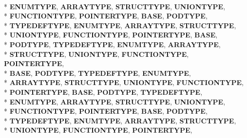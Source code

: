 \begin{DoxyCompactItemize}
\\*
{\bfseries E\-N\-U\-M\-T\-Y\-P\-E}, 
{\bfseries A\-R\-R\-A\-Y\-T\-Y\-P\-E}, 
{\bfseries S\-T\-R\-U\-C\-T\-T\-Y\-P\-E}, 
{\bfseries U\-N\-I\-O\-N\-T\-Y\-P\-E}, 
\\*
{\bfseries F\-U\-N\-C\-T\-I\-O\-N\-T\-Y\-P\-E}, 
{\bfseries P\-O\-I\-N\-T\-E\-R\-T\-Y\-P\-E}, 
{\bfseries B\-A\-S\-E}, 
{\bfseries P\-O\-D\-T\-Y\-P\-E}, 
\\*
{\bfseries T\-Y\-P\-E\-D\-E\-F\-T\-Y\-P\-E}, 
{\bfseries E\-N\-U\-M\-T\-Y\-P\-E}, 
{\bfseries A\-R\-R\-A\-Y\-T\-Y\-P\-E}, 
{\bfseries S\-T\-R\-U\-C\-T\-T\-Y\-P\-E}, 
\\*
{\bfseries U\-N\-I\-O\-N\-T\-Y\-P\-E}, 
{\bfseries F\-U\-N\-C\-T\-I\-O\-N\-T\-Y\-P\-E}, 
{\bfseries P\-O\-I\-N\-T\-E\-R\-T\-Y\-P\-E}, 
{\bfseries B\-A\-S\-E}, 
\\*
{\bfseries P\-O\-D\-T\-Y\-P\-E}, 
{\bfseries T\-Y\-P\-E\-D\-E\-F\-T\-Y\-P\-E}, 
{\bfseries E\-N\-U\-M\-T\-Y\-P\-E}, 
{\bfseries A\-R\-R\-A\-Y\-T\-Y\-P\-E}, 
\\*
{\bfseries S\-T\-R\-U\-C\-T\-T\-Y\-P\-E}, 
{\bfseries U\-N\-I\-O\-N\-T\-Y\-P\-E}, 
{\bfseries F\-U\-N\-C\-T\-I\-O\-N\-T\-Y\-P\-E}, 
{\bfseries P\-O\-I\-N\-T\-E\-R\-T\-Y\-P\-E}, 
\\*
{\bfseries B\-A\-S\-E}, 
{\bfseries P\-O\-D\-T\-Y\-P\-E}, 
{\bfseries T\-Y\-P\-E\-D\-E\-F\-T\-Y\-P\-E}, 
{\bfseries E\-N\-U\-M\-T\-Y\-P\-E}, 
\\*
{\bfseries A\-R\-R\-A\-Y\-T\-Y\-P\-E}, 
{\bfseries S\-T\-R\-U\-C\-T\-T\-Y\-P\-E}, 
{\bfseries U\-N\-I\-O\-N\-T\-Y\-P\-E}, 
{\bfseries F\-U\-N\-C\-T\-I\-O\-N\-T\-Y\-P\-E}, 
\\*
{\bfseries P\-O\-I\-N\-T\-E\-R\-T\-Y\-P\-E}, 
{\bfseries B\-A\-S\-E}, 
{\bfseries P\-O\-D\-T\-Y\-P\-E}, 
{\bfseries T\-Y\-P\-E\-D\-E\-F\-T\-Y\-P\-E}, 
\\*
{\bfseries E\-N\-U\-M\-T\-Y\-P\-E}, 
{\bfseries A\-R\-R\-A\-Y\-T\-Y\-P\-E}, 
{\bfseries S\-T\-R\-U\-C\-T\-T\-Y\-P\-E}, 
{\bfseries U\-N\-I\-O\-N\-T\-Y\-P\-E}, 
\\*
{\bfseries F\-U\-N\-C\-T\-I\-O\-N\-T\-Y\-P\-E}, 
{\bfseries P\-O\-I\-N\-T\-E\-R\-T\-Y\-P\-E}, 
{\bfseries B\-A\-S\-E}, 
{\bfseries P\-O\-D\-T\-Y\-P\-E}, 
\\*
{\bfseries T\-Y\-P\-E\-D\-E\-F\-T\-Y\-P\-E}, 
{\bfseries E\-N\-U\-M\-T\-Y\-P\-E}, 
{\bfseries A\-R\-R\-A\-Y\-T\-Y\-P\-E}, 
{\bfseries S\-T\-R\-U\-C\-T\-T\-Y\-P\-E}, 
\\*
{\bfseries U\-N\-I\-O\-N\-T\-Y\-P\-E}, 
{\bfseries F\-U\-N\-C\-T\-I\-O\-N\-T\-Y\-P\-E}, 
{\bfseries P\-O\-I\-N\-T\-E\-R\-T\-Y\-P\-E}, 

\end{DoxyCompactItemize}
